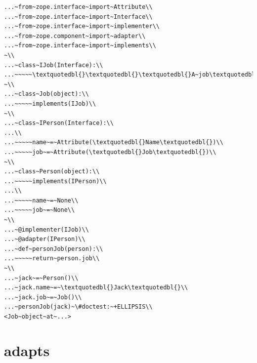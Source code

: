 \documentclass[a4paper,openany,twoside,draft]{book}
\begin{document}
\begin{verbatim}
...~from~zope.interface~import~Attribute\\
...~from~zope.interface~import~Interface\\
...~from~zope.interface~import~implementer\\
...~from~zope.component~import~adapter\\
...~from~zope.interface~import~implements\\
~\\
...~class~IJob(Interface):\\
...~~~~~\textquotedbl{}\textquotedbl{}\textquotedbl{}A~job\textquotedbl{}\textquotedbl{}\textquotedbl{}\\
~\\
...~class~Job(object):\\
...~~~~~implements(IJob)\\
~\\
...~class~IPerson(Interface):\\
...\\
...~~~~~name~=~Attribute(\textquotedbl{}Name\textquotedbl{})\\
...~~~~~job~=~Attribute(\textquotedbl{}Job\textquotedbl{})\\
~\\
...~class~Person(object):\\
...~~~~~implements(IPerson)\\
...\\
...~~~~~name~=~None\\
...~~~~~job~=~None\\
~\\
...~@implementer(IJob)\\
...~@adapter(IPerson)\\
...~def~personJob(person):\\
...~~~~~return~person.job\\
~\\
...~jack~=~Person()\\
...~jack.name~=~\textquotedbl{}Jack\textquotedbl{}\\
...~jack.job~=~Job()\\
...~personJob(jack)~\#doctest:~+ELLIPSIS\\
<Job~object~at~...>
\end{verbatim}


\section*{adapts%
  \label{adapts}%
}
\end{document}
